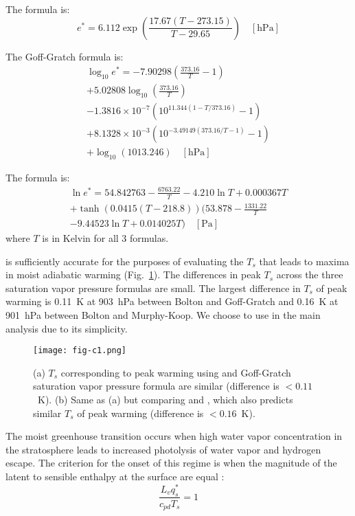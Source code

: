 \documentclass[]{ametsocV6.1}
\begin{document}
The \cite{bolton1980} formula is:
\begin{equation}
e^* = 6.112 \exp\left(\frac{17.67 (T - 273.15)}{T - 29.65}\right) \quad [\text{hPa}]
\label{eq:bolton}
\end{equation}

The Goff-Gratch formula is:
\begin{multline}
\log_{10} e^* = -7.90298 \left(\frac{373.16}{T} - 1\right)\\ + 5.02808 \log_{10}\left(\frac{373.16}{T}\right)\\ - 1.3816 \times 10^{-7} \left(10^{11.344 (1 - T/373.16)} - 1\right)\\ + 8.1328 \times 10^{-3} \left(10^{-3.49149 (373.16/T - 1)} - 1\right)\\ + \log_{10}(1013.246) \quad [\text{hPa}]
\end{multline}

The \cite{murphy2005} formula is:
\begin{multline}
\ln e^* = 54.842763 - \frac{6763.22}{T} - 4.210 \ln T + 0.000367 T\\ + \tanh\left(0.0415 (T - 218.8)\right) \biggl(53.878 - \frac{1331.22}{T}\\ - 9.44523 \ln T + 0.014025 T\biggl) \quad [\text{Pa}]
\end{multline}
where $T$ is in Kelvin for all 3 formulas.

\cite{bolton1980} is sufficiently accurate for the purposes of evaluating the $T_s$ that leads to maxima in moist adiabatic warming (Fig.~\ref{fig:fig-c1}). The differences in peak $T_s$ across the three saturation vapor pressure formulas are small. The largest difference in $T_s$ of peak warming is 0.11~K at 903~hPa between Bolton and Goff-Gratch and 0.16~K at 901~hPa between Bolton and Murphy-Koop. We choose to use \cite{bolton1980} in the main analysis due to its simplicity.

\begin{figure}[htbp]
 \centering
 \texttt{[image: fig-c1.png]}
 \caption{(a) $T_s$ corresponding to peak warming using \cite{bolton1980} and Goff-Gratch saturation vapor pressure formula are similar (difference is $<0.11$~K). (b) Same as (a) but comparing \cite{bolton1980} and \cite{murphy2005}, which also predicts similar $T_s$ of peak warming (difference is $<0.16$~K).}\label{fig:fig-c1}
\end{figure}

\appendix[D] 
\label{app:sens-vs-mag}
The moist greenhouse transition occurs when high water vapor concentration in the stratosphere leads to increased photolysis of water vapor and hydrogen escape. The criterion for the onset of this regime is when the magnitude of the latent to sensible enthalpy at the surface are equal \citep{wordsworth2013}:
\begin{equation}
\frac{L_v q_s^*}{c_{pd} T_s} = 1
\label{eq:mag-equal}
\end{equation}
\end{document}
